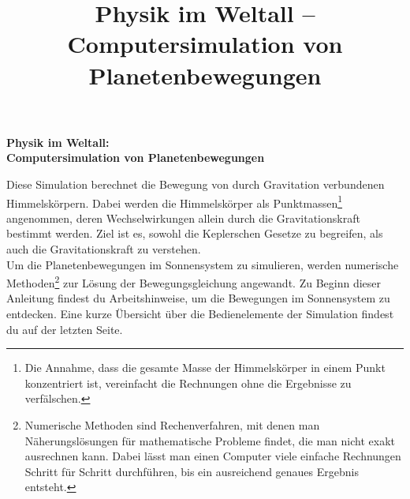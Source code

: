 \documentclass{scrartcl}
\title{Physik im Weltall -- Computersimulation von Planetenbewegungen}
\date{}
\begin{document}
\begin{center}
    {\huge\textbf{\sffamily Physik im Weltall:\\ Computersimulation von Planetenbewegungen}\\[1cm]}
\end{center}
Diese Simulation berechnet die Bewegung von durch Gravitation verbundenen Himmelskörpern.
Dabei werden die Himmelskörper als Punktmassen\footnote{Die Annahme, dass die gesamte Masse der Himmelskörper in einem Punkt  konzentriert ist, vereinfacht die Rechnungen ohne die Ergebnisse zu verfälschen.} angenommen, deren Wechselwirkungen allein durch die Gravitationskraft bestimmt werden.
Ziel ist es, sowohl die Keplerschen Gesetze zu begreifen, als auch die Gravitationskraft zu verstehen. \\
Um die Planetenbewegungen im Sonnensystem zu simulieren, werden numerische Methoden\footnote{Numerische Methoden sind Rechenverfahren, mit denen man Näherungslösungen für mathematische Probleme findet, die man nicht exakt ausrechnen kann. Dabei lässt man einen Computer viele einfache Rechnungen Schritt für Schritt durchführen, bis ein ausreichend genaues Ergebnis entsteht.} zur Lösung der Bewegungsgleichung angewandt.
Zu Beginn dieser Anleitung findest du Arbeitshinweise, um die Bewegungen im Sonnensystem zu entdecken. Eine kurze Übersicht über die Bedienelemente der Simulation findest du auf der letzten Seite.\\

\end{document}
